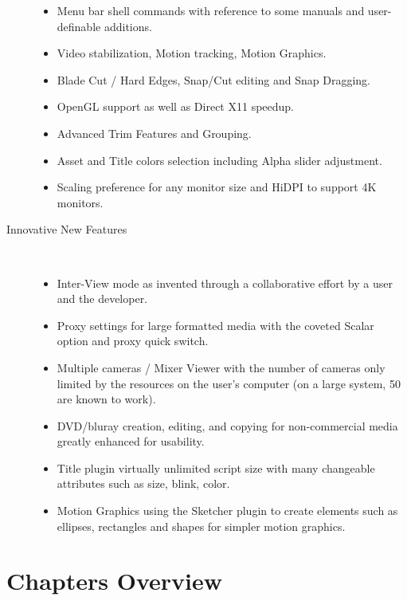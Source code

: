 \begin{description}
\begin{itemize}
                \item Menu bar shell commands with reference to some manuals and user-definable additions.
                \item Video stabilization, Motion tracking, Motion Graphics.
                \item Blade Cut / Hard Edges, Snap/Cut editing and Snap Dragging.
                \item OpenGL support as well as Direct X11 speedup.
                \item Advanced Trim Features and Grouping.
                \item Asset and Title colors selection including Alpha slider adjustment.
                \item Scaling preference for any monitor size and HiDPI to support 4K monitors.
            \end{itemize}
            \item[Innovative New Features] ~\\
                \begin{itemize}
                    \item Inter-View mode as invented through a collaborative effort by a user and the developer.
                    \item Proxy settings for large formatted media with the coveted Scalar option and proxy quick switch.
                    \item Multiple cameras / Mixer Viewer with the number of cameras only limited by the resources on the user’s computer (on a large system, 50 are known to work).
                    \item DVD/bluray creation, editing, and copying for non-commercial media greatly enhanced for usability.
                    \item Title plugin virtually unlimited script size with many changeable attributes such as size, blink, color.
                    \item Motion Graphics using the Sketcher plugin to create elements such as ellipses, rectangles and shapes for simpler motion graphics.
                \end{itemize}
\end{description}

\section*{Chapters Overview}%
\label{sec:chapters_overview}


